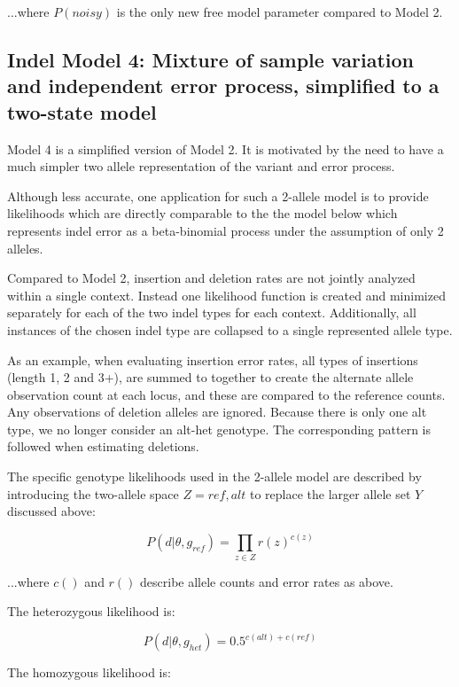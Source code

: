 \documentclass{article}
\begin{document}
...where $P(noisy)$ is the only new free model parameter compared to Model 2.


\subsection{Indel Model 4: Mixture of sample variation and independent error process, simplified to a two-state model}

Model 4 is a simplified version of Model 2. It is motivated by the need to have a much simpler two allele representation of the variant and error process.

Although less accurate, one application for such a 2-allele model is to provide likelihoods which are directly comparable to the the model below which represents indel error as a beta-binomial process under the assumption of only 2 alleles.

Compared to Model 2, insertion and deletion rates are not jointly analyzed within a single context. Instead one likelihood function is created and minimized separately for each of the two indel types for each context. Additionally, all instances of the chosen indel type are collapsed to a single represented allele type.

As an example, when evaluating insertion error rates, all types of insertions (length 1, 2 and 3+), are summed to together to create the alternate allele observation count at each locus, and these are compared to the reference counts. Any observations of deletion alleles are ignored. Because there is only one alt type, we no longer consider an alt-het genotype. The corresponding pattern is followed when estimating deletions.

The specific genotype likelihoods used in the 2-allele model are described by introducing the two-allele space $Z = {ref,alt}$ to replace the larger allele set $Y$ discussed above:

\begin{equation*}
P ( d \vert \theta, g_{ref}) = \prod_{z \in Z} r(z)^{c(z)}
\end{equation*}

...where $c()$ and $r()$ describe allele counts and error rates as above.

The heterozygous likelihood is:

\begin{equation*}
P (d \vert \theta, g_{het}) = 0.5^{c(alt) + c(ref)}
\end{equation*}

The homozygous likelihood is:
\end{document}
